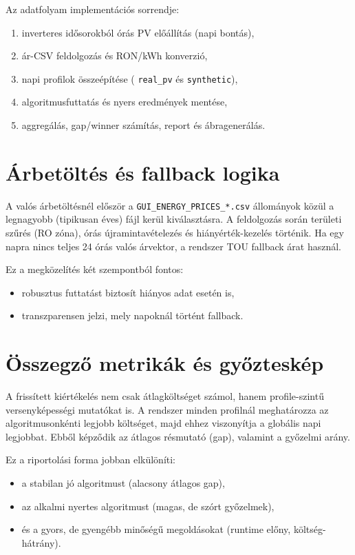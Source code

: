 Az adatfolyam implementációs sorrendje:
\begin{enumerate}
  \item inverteres idősorokból órás PV előállítás (napi bontás),
  \item ár-CSV feldolgozás és RON/kWh konverzió,
  \item napi profilok összeépítése (
  \texttt{real\_pv} és \texttt{synthetic}),
  \item algoritmusfuttatás és nyers eredmények mentése,
  \item aggregálás, gap/winner számítás, report és ábragenerálás.
\end{enumerate}

\section{Árbetöltés és fallback logika}
A valós árbetöltésnél először a \texttt{GUI\_ENERGY\_PRICES\_*.csv} állományok közül a legnagyobb (tipikusan éves) fájl kerül kiválasztásra. A feldolgozás során területi szűrés (RO zóna), órás újramintavételezés és hiányérték-kezelés történik. Ha egy napra nincs teljes 24 órás valós árvektor, a rendszer TOU fallback árat használ.

Ez a megközelítés két szempontból fontos:
\begin{itemize}
  \item robusztus futtatást biztosít hiányos adat esetén is,
  \item transzparensen jelzi, mely napoknál történt fallback.
\end{itemize}

\section{Összegző metrikák és győzteskép}
A frissített kiértékelés nem csak átlagköltséget számol, hanem profile-szintű versenyképességi mutatókat is. A rendszer minden profilnál meghatározza az algoritmusonkénti legjobb költséget, majd ehhez viszonyítja a globális napi legjobbat. Ebből képződik az átlagos résmutató (gap), valamint a győzelmi arány.

Ez a riportolási forma jobban elkülöníti:
\begin{itemize}
  \item a stabilan jó algoritmust (alacsony átlagos gap),
  \item az alkalmi nyertes algoritmust (magas, de szórt győzelmek),
  \item és a gyors, de gyengébb minőségű megoldásokat (runtime előny, költség-hátrány).
\end{itemize}

